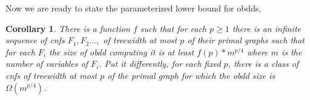 \documentclass{article}
\newtheorem{corollary}{Corollary}
\begin{document}
\begin{comment}
Let us reformulate the statement of Theorem \ref{maintheor} in terms of the number
of variables of $F_{r,k}$ and the treewidth of its primal graph, having in mind the bounds
on the treewidth as in Lemma \ref{twf}.

First of all, taking into account that $k \geq p/2$, where $p$ is the treewidth of the primal graph of $F_{r,k}$,
the lower bound can be seen as $2^{rp/4}$. Next, let $m$ be the number of variables of $F_{r,k}$.
Then, it is not hard to observe that $2^r \geq \frac{m}{2{k \choose 2}} \geq \frac{m}{2{(p+1) \choose 2}}$.
Replacing $2^r$ this way in $2^{rp/4}$, we obtain 
$(\frac{m}{2{(p+1) \choose 2}})^{p/4}={2(p+1) \choose 2}^{-p/4}*m^{p/4}$ as a lower bound on the 
{\sc obdd} size for $F_{r,k}$. Clearly, if we consider $p$ as a constant, this lower bound can be seen
as $\Omega(m^{p/4})$. 
\end{comment}

\begin{comment}
Let
$n$ be the number of nodes of $T_r$. Taking into account that $2^r=n-1$, 
$2^{rk/2}=(n-1)^{k/2}$. Further on, according to Lemma \ref{twf}, $k \geq (p+1)/2$
where $p$ is the treewidth of the primal graph of $F_{r,k}$. Hence the lower bound
can be replaced by $(n-1)^{p/4}$. Finally $(n-1)=m/O(p^2)$ where $m$ is the number of 
variables. It is not hard to see that for a sufficiently big $r$ compared to $p$ (causing a sufficiently big 
$m$) the bound $(n-1)^{p/4}$ can be rewritten as $\frac{m^{p/4}}{o(m)}$.
Theorem \ref{maintheor} requires $r$ to be even. However, for an odd $r$,
the theorem implies an obvious bound of $2^{\frac{(r-1)k}{2}}=2^{rk/2}/2^{k/2}$,
where $2^{k/2}$ can be included into $o(m)$ starting from a sufficiently large $m$. 

In order to prove the main result of the paper we need to look at the above statement
from a little bit different angle of finding a lower bound for the \emph{given} fixed treewidth $p^*$.
If $p^*$ is odd just take $k=(p^*+1)/2$ and the above reasoning directly applies.
Otherwise, take $p=p^*-1$ and in the resulting formula replace $p$ by $p^*-1$ which would cost 
a factor that can be included into $o(m)$ denominator. 
\end{comment}

Now we are ready to state the parameterized lower bound for {\sc obdd}s. 

\begin{corollary} \label{paramlower}
There is a function $f$ such that for each $p \geq 1$
there is an infinite sequence of {\sc cnf}s $F_1, F_2 \dots,$ of treewidth at most $p$
of their primal graphs 
such that for each $F_i$ the size of {\sc obdd} 
computing it is at least $f(p)*m^{p/4}$ where $m$ is the number of variables of $F_i$. 
Put it differently, for each fixed $p$, there is a class of {\sc cnf}s
of treewidth at most $p$ of the primal graph for which the {\sc obdd} size is $\Omega(m^{p/4})$. 
\end{corollary}
\end{document}
